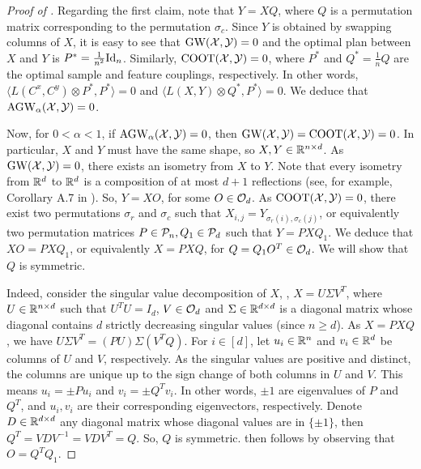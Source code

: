 \begin{proof}[Proof of ]
  Regarding the first claim, note that $Y = X Q$,
  where $Q$ is a permutation matrix corresponding to the permutation $\sigma_c$.
  Since $Y$ is obtained by swapping columns of $X$, it is easy to see that $\text{GW}(\mathcal X, \mathcal Y) = 0$
  and the optimal plan between $X$ and $Y$ is $P^* = \frac{1}{n^2} \text{Id}_n$.
  Similarly, $\text{COOT}(\mathcal X, \mathcal Y) = 0$, where $P^*$ and $Q^* = \frac{1}{n} Q$ are the optimal sample and
  feature couplings, respectively. In other words,
  $\langle L(C^x, C^y)\otimes P^*, P^* \rangle = 0$ and
  $\langle L(X, Y) \otimes Q^*, P^* \rangle = 0$. We deduce that $\text{AGW}_{\alpha}(\mathcal X, \mathcal Y) = 0$.

  Now, for $0 < \alpha < 1$, if $\text{AGW}_{\alpha}(\mathcal X, \mathcal Y) = 0$, then
  $\text{GW}(\mathcal X, \mathcal Y) = \text{COOT}(\mathcal X, \mathcal Y) = 0$. In particular,
  $X$ and $Y$ must have the same shape, so $X, Y \in \mathbb R^{n \times d}$.
  As $\text{GW}(\mathcal X, \mathcal Y) = 0$, there exists an isometry from $X$ to $Y$. Note that every isometry from
  $\mathbb R^d$ to $\mathbb R^d$ is a composition of at most $d+1$ reflections
  (see, for example, Corollary A.7 in \citep{Konrad}). So, $Y = X O$, for some $O \in \mathcal O_d$.
  As $\text{COOT}(\mathcal X, \mathcal Y) = 0$, there exist two permutations
  $\sigma_r$ and $\sigma_c$ such that $X_{i, j} = Y_{\sigma_r(i), \sigma_c(j)}$,
  or equivalently two permutation matrices $P \in \mathcal P_n, Q_1 \in \mathcal P_d$ such that $Y = P X Q_1$.
  We deduce that $X O = P X Q_1$, or equivalently $X = P X Q$, for
  $Q = Q_1 O^T \in \mathcal O_d$. We will show that $Q$ is symmetric.

  Indeed, consider the singular value decomposition of $X$, \ie,
  $X = U \Sigma V^T$, where $U \in \mathbb R^{n \times d}$ such that $U^T U = I_d$,
  $V \in \mathcal O_d$ and $\Sigma \in \mathbb R^{d \times d}$ is a diagonal matrix
  whose diagonal contains $d$ strictly decreasing singular values (since $n \geq d$). As $X = P X Q$,
  we have $U \Sigma V^T = (PU) \Sigma (V^T Q)$. For $i \in [d]$, let $u_i \in \mathbb R^n$
  and $v_i \in \mathbb R^d$ be columns of $U$ and $V$, respectively.
  As the singular values are positive and distinct, the columns are unique up to
  the sign change of both columns in $U$ and $V$. This means $u_i = \pm Pu_i$ and
  $v_i = \pm Q^T v_i$. In other words, $\pm 1$ are eigenvalues of $P$ and $Q^T$, and
  $u_i, v_i$ are their corresponding eigenvectors, respectively. Denote $D \in \mathbb R^{d \times d}$
  any diagonal matrix whose diagonal values are in $\{ \pm 1 \}$, then
  $Q^T = V D V^{-1} = V D V^T = Q$. So, $Q$ is symmetric.
   then follows by observing that $O = Q^T Q_1$.
\end{proof}

